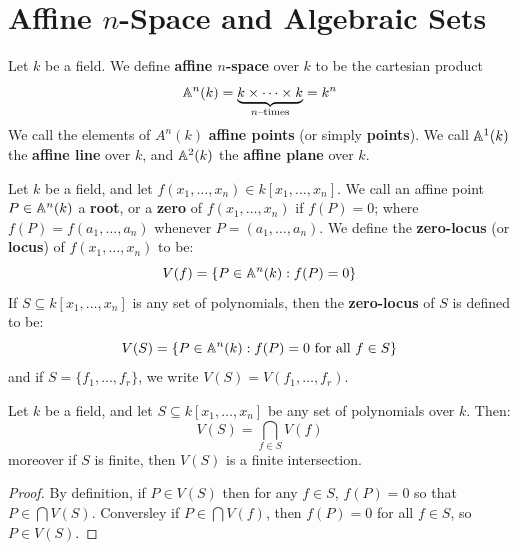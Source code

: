 \section{Affine $n$-Space and Algebraic Sets}\label{section_1.2}

\begin{definition}
  Let $k$ be a field. We define \textbf{affine $n$-space} over $k$ to
  be the cartesian product
  \begin{equation*}
    \mathbb{A}^n(k)=\underbrace{k \times \dots \times k}_{n\text{--times}}
    = k^n
  \end{equation*}
  We call the elements of $A^n(k)$ \textbf{affine points} (or simply
  \textbf{points}). We call $\mathbb{A}^1(k)$ the \textbf{affine line} over
  $k$, and $\mathbb{A}^2(k)$ the \textbf{affine plane} over $k$.
\end{definition}

\begin{definition}
  Let $k$ be a field, and let $f(x_1, \dots, x_n) \in k[x_1, \dots,
  x_n]$. We call an affine point $P \in \mathbb{A}^n(k)$ a \textbf{root}, or a
  \textbf{zero} of $f(x_1, \dots, x_n)$ if $f(P)=0$; where
  $f(P)=f(a_1, \dots, a_n)$ whenever $P=(a_1, \dots, a_n)$. We define
  the \textbf{zero-locus} (or \textbf{locus}) of $f(x_1, \dots, x_n)$
  to be:
  \begin{equation*}
    V(f)=\{P \in \mathbb{A}^n(k) : f(P)=0\}
  \end{equation*}
  If $S \subseteq k[x_1, \dots, x_n]$ is any set of polynomials, then
  the \textbf{zero-locus} of $S$ is defined to be:
  \begin{equation*}
    V(S)=\{ P \in \mathbb{A}^n(k) : f(P)=0 \text{ for all } f \in S \}
  \end{equation*}
  and if $S=\{f_1, \dots, f_r\}$, we write $V(S)=V(f_1, \dots, f_r)$.
\end{definition}

\begin{proposition}\label{proposition_10.1.1}
  Let $k$ be a field, and let $S \subseteq k[x_1, \dots, x_n]$ be any
  set of polynomials over $k$. Then:
  \begin{equation*}
    V(S)=\bigcap_{f \in S}{V(f)}
  \end{equation*}
  moreover if $S$ is finite, then $V(S)$ is a finite intersection.
\end{proposition}
\begin{proof}
  By definition, if $P \in V(S)$ then for any $f \in S$, $f(P)=0$ so
  that $P \in \bigcap{V(S)}$. Conversley if $P \in \bigcap{V(f)}$,
  then $f(P)=0$ for all $f \in S$, so $P \in V(S)$.
\end{proof}

